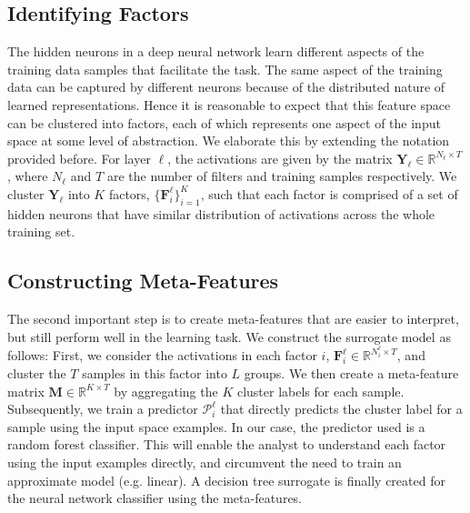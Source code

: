 \documentclass[final]{article}
\begin{document}
\subsection{Identifying Factors}
The hidden neurons in a deep neural network learn different aspects of the training data samples that facilitate the task. The same aspect of the training data can be captured by different neurons because of the distributed nature of learned representations. Hence it is reasonable to expect that this feature space can be clustered into factors, each of which represents one aspect of the input space at some level of abstraction. We elaborate this by extending the notation provided before. For layer $\ell$, the activations are given by the matrix $\mathbf{Y}_{\ell} \in \mathbb{R}^{N_{\ell} \times T}$, where $N_{\ell}$ and $T$ are the number of filters and training samples respectively. We cluster $\mathbf{Y}_{\ell}$ into $K$ factors, $\{\mathbf{F}^{\ell}_i\}_{i=1}^K$, such that each factor is comprised of a set of hidden neurons that have similar distribution of activations across the whole training set. 


\subsection{Constructing Meta-Features}
The second important step is to create meta-features that are easier to interpret, but still perform well in the learning task. We construct the surrogate model as follows: First, we consider the activations in each factor $i$, $\mathbf{F}^{\ell}_i \in \mathbb{R}^{N^{\ell}_i \times T}$, and cluster the $T$ samples in this factor into $L$ groups. We then create a meta-feature matrix $\mathbf{M} \in \mathbb{R}^{K \times T}$ by aggregating the $K$ cluster labels for each sample. Subsequently, we train a predictor $\mathcal{P}^{\ell}_i$ that directly predicts the cluster label for a sample using the input space examples. In our case, the predictor used is a random forest classifier. This will enable the analyst to understand each factor using the input examples directly, and circumvent the need to train an approximate model (e.g. linear). A decision tree surrogate is finally created for the neural network classifier using the meta-features.
\end{document}
